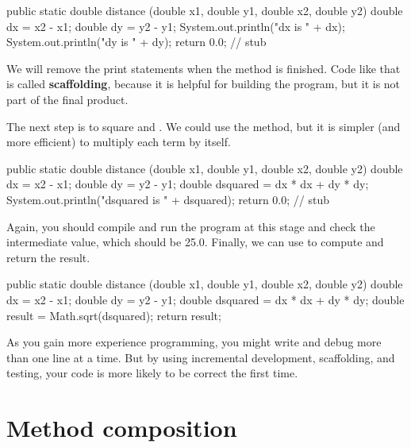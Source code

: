 \begin{code}
public static double distance
        (double x1, double y1, double x2, double y2) {
    double dx = x2 - x1;
    double dy = y2 - y1;
    System.out.println("dx is " + dx);
    System.out.println("dy is " + dy);
    return 0.0;  // stub
}
\end{code}


We will remove the print statements when the method is finished.
Code like that is called {\bf scaffolding}, because it is helpful for building the program, but it is not part of the final product.

The next step is to square  and .
We could use the  method, but it is simpler (and more efficient) to multiply each term by itself.

\begin{code}
public static double distance
        (double x1, double y1, double x2, double y2) {
    double dx = x2 - x1;
    double dy = y2 - y1;
    double dsquared = dx * dx + dy * dy;
    System.out.println("dsquared is " + dsquared);
    return 0.0;  // stub
}
\end{code}

Again, you should compile and run the program at this stage and check the intermediate value, which should be 25.0.
Finally, we can use  to compute and return the result.

\begin{code}
public static double distance
        (double x1, double y1, double x2, double y2) {
    double dx = x2 - x1;
    double dy = y2 - y1;
    double dsquared = dx * dx + dy * dy;
    double result = Math.sqrt(dsquared);
    return result;
}
\end{code}


As you gain more experience programming, you might write and debug more than one line at a time.
But by using incremental development, scaffolding, and testing, your code is more likely to be correct the first time.


\section{Method composition}


